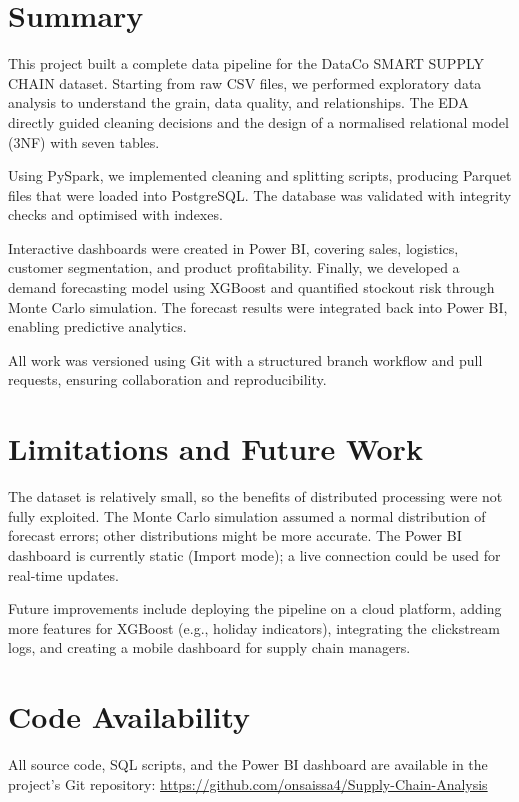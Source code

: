 \documentclass[12pt, a4paper]{report}
\begin{document}
\section{Summary}
This project built a complete data pipeline for the DataCo SMART SUPPLY CHAIN dataset. Starting from raw CSV files, we performed exploratory data analysis to understand the grain, data quality, and relationships. The EDA directly guided cleaning decisions and the design of a normalised relational model (3NF) with seven tables.

Using PySpark, we implemented cleaning and splitting scripts, producing Parquet files that were loaded into PostgreSQL. The database was validated with integrity checks and optimised with indexes.

Interactive dashboards were created in Power BI, covering sales, logistics, customer segmentation, and product profitability. Finally, we developed a demand forecasting model using XGBoost and quantified stockout risk through Monte Carlo simulation. The forecast results were integrated back into Power BI, enabling predictive analytics.

All work was versioned using Git with a structured branch workflow and pull requests, ensuring collaboration and reproducibility.

\section{Limitations and Future Work}
The dataset is relatively small, so the benefits of distributed processing were not fully exploited. The Monte Carlo simulation assumed a normal distribution of forecast errors; other distributions might be more accurate. The Power BI dashboard is currently static (Import mode); a live connection could be used for real‑time updates.

Future improvements include deploying the pipeline on a cloud platform, adding more features for XGBoost (e.g., holiday indicators), integrating the clickstream logs, and creating a mobile dashboard for supply chain managers.


\section*{Code Availability}
All source code, SQL scripts, and the Power BI dashboard are available in the project’s Git repository:  
\url{https://github.com/onsaissa4/Supply-Chain-Analysis}
\end{document}
